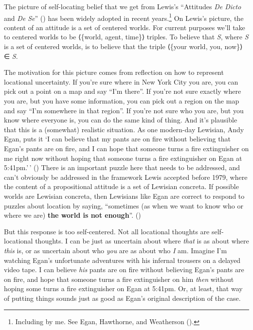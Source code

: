 \documentclass[
  10pt,
  letterpaper,
  DIV=11,
  numbers=noendperiod,
  twoside]{scrartcl}
\begin{document}
The picture of self-locating belief that we get from Lewis's ``Attitudes
\emph{De Dicto} and \emph{De Se}'' () has been widely adopted in recent years.\footnote{Including by
  me. See Egan, Hawthorne, and Weatherson
  ().} On Lewis's picture, the
content of an attitude is a set of centered worlds. For current purposes
we'll take to centered worlds to be ⟨\{world, agent, time\}⟩ triples. To
believe that \emph{S}, where \emph{S} is a set of centered worlds, is to
believe that the triple ⟨\{your world, you, now\}⟩ ∈ \emph{S}.

The motivation for this picture comes from reflection on how to
represent locational uncertainty. If you're sure where in New York City
you are, you can pick out a point on a map and say ``I'm there''. If
you're not sure exactly where you are, but you have some information,
you can pick out a region on the map and say ``I'm somewhere in that
region''. If you're not sure who you are, but you know where everyone
is, you can do the same kind of thing. And it's plausible that this is a
(somewhat) realistic situation. As one modern-day Lewisian, Andy Egan,
puts it `I can believe that my pants are on fire without believing that
Egan's pants are on fire, and I can hope that someone turns a fire
extinguisher on me right now without hoping that someone turns a fire
extinguisher on Egan at 5:41pm.'\,'
() There is an important
puzzle here that needs to be addressed, and can't obviously be addressed
in the framework Lewis accepted before 1979, where the content of a
propositional attitude is a set of Lewisian concreta. If possible worlds
are Lewisian concreta, then Lewisians like Egan are correct to respond
to puzzles about location by saying, ``sometimes (as when we want to
know who or where we are) \textbf{the world is not enough}''.
()

But this response is too self-centered. Not all locational thoughts are
self-locational thoughts. I can be just as uncertain about where
\emph{that} is as about where \emph{this} is, or as uncertain about who
\emph{you} are as about who \emph{I} am. Imagine I'm watching Egan's
unfortunate adventures with his infernal trousers on a delayed video
tape. I can believe \emph{his} pants are on fire without believing
Egan's pants are on fire, and hope that someone turns a fire
extinguisher on him \emph{then} without hoping some turns a fire
extinguisher on Egan at 5:41pm. Or, at least, that way of putting things
sounds just as good as Egan's original description of the case.
\end{document}

